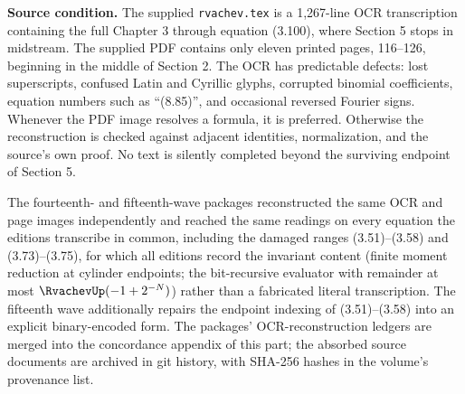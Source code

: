 \documentclass[11pt,oneside]{article}
\numberwithin{equation}{section}
\theoremstyle{definition}
\theoremstyle{remark}
\begin{document}
\begin{scopebox}
\textbf{Source condition.}
The supplied \texttt{rvachev.tex} is a 1,267-line OCR transcription containing
the full Chapter 3 through equation (3.100), where Section 5 stops in midstream.
The supplied PDF contains only eleven printed pages, 116--126, beginning in the
middle of Section 2.  The OCR has predictable defects: lost superscripts,
confused Latin and Cyrillic glyphs, corrupted binomial coefficients, equation
numbers such as ``(8.85)'', and occasional reversed Fourier signs.  Whenever the
PDF image resolves a formula, it is preferred.  Otherwise the reconstruction is
checked against adjacent identities, normalization, and the source's own proof.
No text is silently completed beyond the surviving endpoint of Section 5.

The fourteenth- and fifteenth-wave packages reconstructed the same OCR and
page images independently and reached the same readings on every equation the
editions transcribe in common, including the damaged ranges (3.51)--(3.58) and
(3.73)--(3.75), for which all editions record the invariant content (finite
moment reduction at cylinder endpoints; the bit-recursive evaluator with
remainder at most $\RvachevUp(-1+2^{-N})$) rather than a fabricated literal
transcription.  The fifteenth wave additionally repairs the endpoint indexing
of (3.51)--(3.58) into an explicit binary-encoded form.  The packages'
OCR-reconstruction ledgers are merged into the concordance appendix of this
part; the absorbed source documents are archived in git history, with
SHA-256 hashes in the volume's provenance list.


\end{scopebox}
\end{document}
